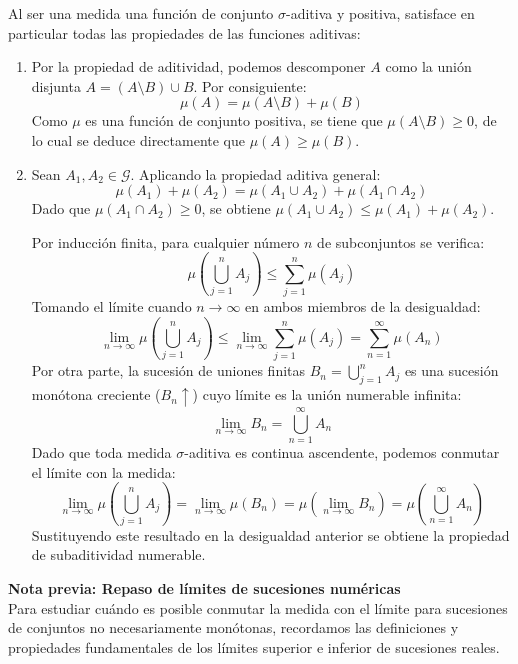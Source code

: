 \begin{demostracion}
Al ser una medida una función de conjunto $\sigma$-aditiva y positiva, satisface en particular todas las propiedades de las funciones aditivas:

\begin{enumerate}[label=\alph*)]
    \item Por la propiedad de aditividad, podemos descomponer $A$ como la unión disjunta $A = (A \setminus B) \cup B$. Por consiguiente:
    \[
        \mu(A) = \mu(A \setminus B) + \mu(B)
    \]
    Como $\mu$ es una función de conjunto positiva, se tiene que $\mu(A \setminus B) \ge 0$, de lo cual se deduce directamente que $\mu(A) \ge \mu(B)$.

    \item Sean $A_1, A_2 \in \mathcal{G}$. Aplicando la propiedad aditiva general:
    \[
        \mu(A_1) + \mu(A_2) = \mu(A_1 \cup A_2) + \mu(A_1 \cap A_2)
    \]
    Dado que $\mu(A_1 \cap A_2) \ge 0$, se obtiene $\mu(A_1 \cup A_2) \le \mu(A_1) + \mu(A_2)$.
    
    Por inducción finita, para cualquier número $n$ de subconjuntos se verifica:
    \[
        \mu\left( \bigcup_{j=1}^n A_j \right) \le \sum_{j=1}^n \mu(A_j)
    \]
    Tomando el límite cuando $n \to \infty$ en ambos miembros de la desigualdad:
    \[
        \lim_{n \to \infty} \mu\left( \bigcup_{j=1}^n A_j \right) \le \lim_{n \to \infty} \sum_{j=1}^n \mu(A_j) = \sum_{n=1}^\infty \mu(A_n)
    \]
    Por otra parte, la sucesión de uniones finitas $B_n = \bigcup_{j=1}^n A_j$ es una sucesión monótona creciente ($B_n \uparrow$) cuyo límite es la unión numerable infinita:
    \[
        \lim_{n \to \infty} B_n = \bigcup_{n=1}^\infty A_n
    \]
    Dado que toda medida $\sigma$-aditiva es continua ascendente, podemos conmutar el límite con la medida:
    \[
        \lim_{n \to \infty} \mu\left( \bigcup_{j=1}^n A_j \right) = \lim_{n \to \infty} \mu(B_n) = \mu\left( \lim_{n \to \infty} B_n \right) = \mu\left( \bigcup_{n=1}^\infty A_n \right)
    \]
    Sustituyendo este resultado en la desigualdad anterior se obtiene la propiedad de subaditividad numerable.
\end{enumerate}
\end{demostracion}
\noindent
\textbf{Nota previa: Repaso de límites de sucesiones numéricas}\\
Para estudiar cuándo es posible conmutar la medida con el límite para sucesiones de conjuntos no necesariamente monótonas, recordamos las definiciones y propiedades fundamentales de los límites superior e inferior de sucesiones reales.


